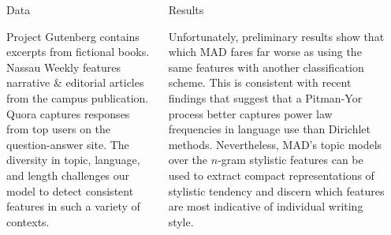 \documentclass[final]{beamer}
\newlength{\sepwid}
\newlength{\onecolwid}
\newlength{\twocolwid}
\begin{document}
\begin{frame}[t]
\begin{columns}[t]
\begin{column}{\twocolwid}
\begin{columns}[t,totalwidth=\twocolwid]
\begin{column}{\onecolwid}
\begin{block}{Data}
\vspace{10 mm}

Project Gutenberg contains excerpts from fictional books. Nassau Weekly features narrative \& editorial articles from the campus publication. Quora captures responses from top users on the question-answer site. The diversity in topic, language, and length challenges our model to detect consistent features in such a variety of contexts.

\end{block}


\end{column} %

\begin{column}{\onecolwid} %


\begin{block}{Results}


\small
\indent Unfortunately, preliminary results show that which MAD fares far worse as using the same features with another classification scheme. This is consistent with recent findings that suggest that a Pitman-Yor process better captures power law frequencies in language use than Dirichlet methods. Nevertheless, MAD's topic models over the $n$-gram stylistic features can be used to extract compact representations of stylistic tendency and discern which features are most indicative of individual writing style.

\end{block}


\end{column} %

\end{columns} %

\end{column} %

\begin{column}{\sepwid}\end{column} %


\end{columns}
\end{frame}
\end{document}

